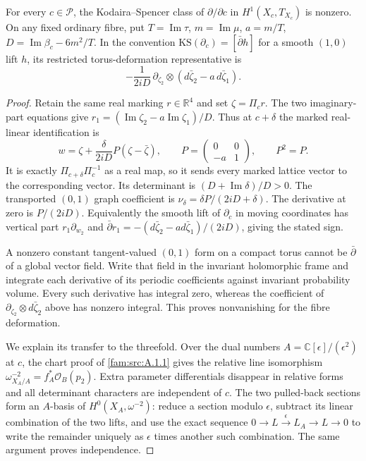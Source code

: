 \begin{proposition}\label{fam:src:A.4.2}\label{fam:st:A.4.2}
For every $c\in\mathcal P$, the Kodaira--Spencer class of $\partial/\partial c$ in $H^1(X_c,T_{X_c})$ is nonzero. On any fixed ordinary fibre, put $T=\operatorname{Im}\tau$, $m=\operatorname{Im}\mu$, $a=m/T$, $D=\operatorname{Im}\beta_c-6m^2/T$. In the convention $\mathrm{KS}(\partial_c)=[\bar\partial h]$ for a smooth $(1,0)$ lift $h$, its restricted torus-deformation representative is
\[
 -\frac{1}{2iD}\,\partial_{\zeta_2}\otimes
       (d\bar\zeta_2-a\,d\bar\zeta_1).
\]
\end{proposition}

\begin{proof}
Retain the same real marking $r\in\mathbb R^4$ and set $\zeta=\Pi_cr$. The two imaginary-part equations give
$r_1=(\operatorname{Im}\zeta_2-a\operatorname{Im}\zeta_1)/D$. Thus at $c+\delta$ the marked real-linear identification is
\[
 w=\zeta+\frac{\delta}{2iD}P(\zeta-\bar\zeta),\qquad
 P=\begin{pmatrix}0&0\\-a&1\end{pmatrix},\qquad P^2=P.
\]
It is exactly $\Pi_{c+\delta}\Pi_c^{-1}$ as a real map, so it sends every marked lattice vector to the corresponding vector. Its determinant is $(D+\operatorname{Im}\delta)/D>0$. The transported $(0,1)$ graph coefficient is $\nu_\delta=\delta P/(2iD+\delta)$. The derivative at zero is $P/(2iD)$. Equivalently the smooth lift of $\partial_c$ in moving coordinates has vertical part $r_1\partial_{w_2}$ and $\bar\partial r_1=-(d\bar\zeta_2-a d\bar\zeta_1)/(2iD)$, giving the stated sign.

A nonzero constant tangent-valued $(0,1)$ form on a compact torus cannot be $\bar\partial$ of a global vector field. Write that field in the invariant holomorphic frame and integrate each derivative of its periodic coefficients against invariant probability volume. Every such derivative has integral zero, whereas the coefficient of $\partial_{\zeta_2}\otimes d\bar\zeta_2$ above has nonzero integral. This proves nonvanishing for the fibre deformation.

We explain its transfer to the threefold. Over the dual numbers $A=\mathbb C[\epsilon]/(\epsilon^2)$ at $c$, the chart proof of \ref{fam:src:A.1.1} gives the relative line isomorphism $\omega^{-2}_{X_A/A}=f_A^*\mathcal O_B(p_2)$. Extra parameter differentials disappear in relative forms and all determinant characters are independent of $c$. The two pulled-back sections form an $A$-basis of $H^0(X_A,\omega^{-2})$: reduce a section modulo $\epsilon$, subtract its linear combination of the two lifts, and use the exact sequence $0\to L\xrightarrow{\epsilon}L_A\to L\to0$ to write the remainder uniquely as $\epsilon$ times another such combination. The same argument proves independence.


\end{proof}
